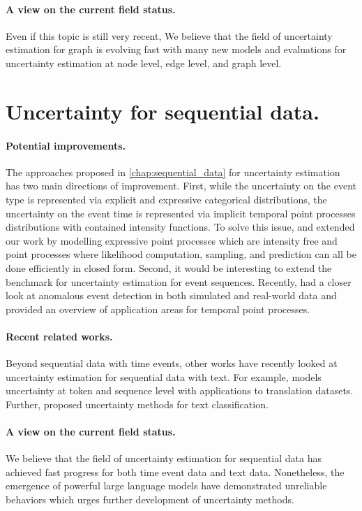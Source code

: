 \paragraph{A view on the current field status.} Even if this topic is still very recent, We believe that the field of uncertainty estimation for graph is evolving fast with many new models and evaluations for uncertainty estimation at node level, edge level, and graph level. 

\section{Uncertainty for sequential data.}

\paragraph{Potential improvements.} The approaches proposed in \cref{chap:sequential_data} for uncertainty estimation has two main directions of improvement. First, while the uncertainty on the event type is represented via explicit and expressive categorical distributions, the uncertainty on the event time is represented via implicit temporal point processes distributions with contained intensity functions. To solve this issue, \cite{shchur2020intensity} and \cite{shchur2020fast} extended our work by modelling expressive point processes which are intensity free and point processes where likelihood computation, sampling, and prediction can all be done efficiently in closed form. Second, it would be interesting to extend the benchmark for uncertainty estimation for event sequences. Recently, \cite{shchur2021detecting} had a closer look at anomalous event detection in both simulated and real-world data and \cite{shchur2021review} provided an overview of application areas for temporal point processes. 

\paragraph{Recent related works.} Beyond sequential data with time events, other works have recently looked at uncertainty estimation for sequential data with text. For example, \cite{malinin2021uncertainty} models uncertainty at token and sequence level with applications to translation datasets. Further, \cite{he2020toward, hu2021uncertainty} proposed uncertainty methods for text classification.

\paragraph{A view on the current field status.} We believe that the field of uncertainty estimation for sequential data has achieved fast progress for both time event data and text data. Nonetheless, the emergence of powerful large language models have demonstrated unreliable behaviors which urges further development of uncertainty methods. 

